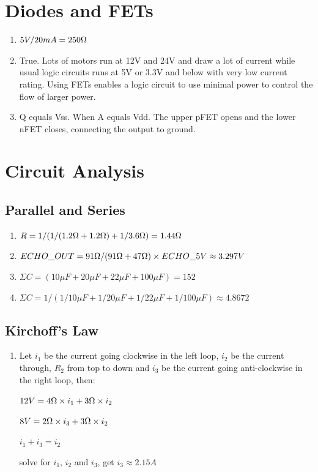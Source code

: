 \documentclass{article}
\begin{document}
\section{Diodes and FETs}
\begin{enumerate}
	\item $5V/20mA=250\ohm$
	\item True. Lots of motors run at 12V and 24V and draw a lot of current while usual logic circuits runs at 5V or 3.3V and below with very low current rating. Using FETs enables a logic circuit to use minimal power to control the flow of larger power.
	\item Q equals Vss. When A equals Vdd. The upper pFET opens and the lower nFET closes, connecting the output to ground.
\end{enumerate}

\section{Circuit Analysis}
\subsection{Parallel and Series}
	\begin{enumerate}
		\item $R=1/(1/(1.2\ohm+1.2\ohm)+1/3.6\ohm)=1.44\ohm$
		\item $ECHO\_OUT=91\ohm/(91\ohm+47\ohm)\times ECHO\_5V\approx 3.297V$
		\item $\Sigma C=(10\mu F+20\mu F+22\mu F+100\mu F)=152$
		\item $\Sigma C=1/(1/10\mu F+1/20\mu F+1/22\mu F+1/100\mu F)\approx 4.8672$
	\end{enumerate}
\subsection{Kirchoff's Law}
	\begin{enumerate}
		\item Let $i_1$ be the current going clockwise in the left loop, $i_2$ be the current through, $R_2$ from top to down and $i_3$ be the current going anti-clockwise in the right loop, then: \par
		$12V = 4\ohm \times i_1 + 3\ohm \times i_2$\par
		$8V = 2\ohm \times i_3 + 3\ohm \times i_2 $\par
		$i_1+i_3=i_2$\par
		solve for $i_1$, $i_2$ and $i_3$, get $i_3 \approx 2.15A$
	\end{enumerate}
	
\end{document}
